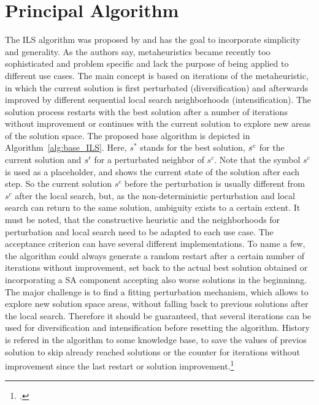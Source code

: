 \section{Principal Algorithm}
\label{sec:algorithm}
The \gls{ILS} algorithm was proposed by \cite{lourenco_iterated_2003} and has the goal to incorporate simplicity and generality.
As the authors say, metaheuristics became recently too sophisticated and problem specific and lack the purpose of
being applied to different use cases. The main concept is based on iterations of the metaheuristic, in which the current
solution is first perturbated (diversification) and afterwards improved by different sequential local search neighborhoods
(intensification). The solution process restarts with the best solution after a number of iterations without improvement
or continues with the current solution to explore new areas of the solution space.
The proposed base algorithm is depicted in Algorithm~\ref{alg:base_ILS}. Here, $s^*$ stands for the best solution,
$s\sp{c}$ for the current solution and $s\sp{\prime}$ for a perturbated neighbor of $s^c$. Note that the symbol $s^c$
is used as a placeholder, and shows the current state of the solution after each step. So the current solution
$s^c$ before the perturbation is usually different from $s^c$ after the local search, but, as the non-deterministic
perturbation and local search can return to the same solution, ambiguity exists to a certain extent.
It must be noted, that the constructive heuristic and  the neighborhoods for perturbation and local search need to be adapted to
each use case. The acceptance criterion can have several different implementations. To name a few, the algorithm could always
generate a random restart after a certain number of iterations without improvement, set back to the actual best solution
obtained or incorporating a \gls{SA} component accepting also worse solutions in the beginninng. The major challenge is
to find a fitting perturbation mechanism, which allows to explore new solution space areas, without falling back to previous solutions
after the local search. Therefore it should be guaranteed, that several iterations can be used for diversification and
intensification before resetting the algorithm. History is refered in the algorithm to some knowledge base,
to save the values of previos solution to skip already reached solutions or the counter for iterations without improvement since the
last restart or solution improvement.\footcite[cf.][]{lourenco_iterated_2003}


